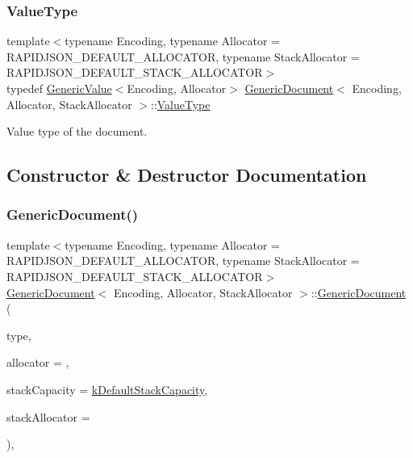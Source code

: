 \subsubsection{\texorpdfstring{Value\+Type}{ValueType}}
{\footnotesize\ttfamily template$<$typename Encoding, typename Allocator = R\+A\+P\+I\+D\+J\+S\+O\+N\+\_\+\+D\+E\+F\+A\+U\+L\+T\+\_\+\+A\+L\+L\+O\+C\+A\+T\+OR, typename Stack\+Allocator = R\+A\+P\+I\+D\+J\+S\+O\+N\+\_\+\+D\+E\+F\+A\+U\+L\+T\+\_\+\+S\+T\+A\+C\+K\+\_\+\+A\+L\+L\+O\+C\+A\+T\+OR$>$ \\
typedef \hyperlink{classGenericValue}{Generic\+Value}$<$Encoding, Allocator$>$ \hyperlink{classGenericDocument}{Generic\+Document}$<$ Encoding, Allocator, Stack\+Allocator $>$\+::\hyperlink{classGenericValue_a43a39bb4fca9b9d3de3da6ac353d25ce}{Value\+Type}}



Value type of the document. 



\subsection{Constructor \& Destructor Documentation}
\mbox{\label{classGenericDocument_a3da21e72ec8f26b9da77d86cc1d41cdd}} 
\subsubsection{\texorpdfstring{Generic\+Document()}{GenericDocument()}\hspace{0.1cm}{\footnotesize\ttfamily [1/3]}}
{\footnotesize\ttfamily template$<$typename Encoding, typename Allocator = R\+A\+P\+I\+D\+J\+S\+O\+N\+\_\+\+D\+E\+F\+A\+U\+L\+T\+\_\+\+A\+L\+L\+O\+C\+A\+T\+OR, typename Stack\+Allocator = R\+A\+P\+I\+D\+J\+S\+O\+N\+\_\+\+D\+E\+F\+A\+U\+L\+T\+\_\+\+S\+T\+A\+C\+K\+\_\+\+A\+L\+L\+O\+C\+A\+T\+OR$>$ \\
\hyperlink{classGenericDocument}{Generic\+Document}$<$ Encoding, Allocator, Stack\+Allocator $>$\+::\hyperlink{classGenericDocument}{Generic\+Document} (\begin{DoxyParamCaption}\item[{\hyperlink{rapidjson_8h_a1d1cfd8ffb84e947f82999c682b666a7}{Type}}]{type,  }\item[{Allocator $\ast$}]{allocator = {},  }\item[{size\+\_\+t}]{stack\+Capacity = {\ttfamily \hyperlink{classGenericDocument_a90d452abe8940d8a9c9634d1c49d8f49}{k\+Default\+Stack\+Capacity}},  }\item[{Stack\+Allocator $\ast$}]{stack\+Allocator = {} }\end{DoxyParamCaption})\hspace{0.3cm}{\ttfamily [inline]}, {\ttfamily [explicit]}}



